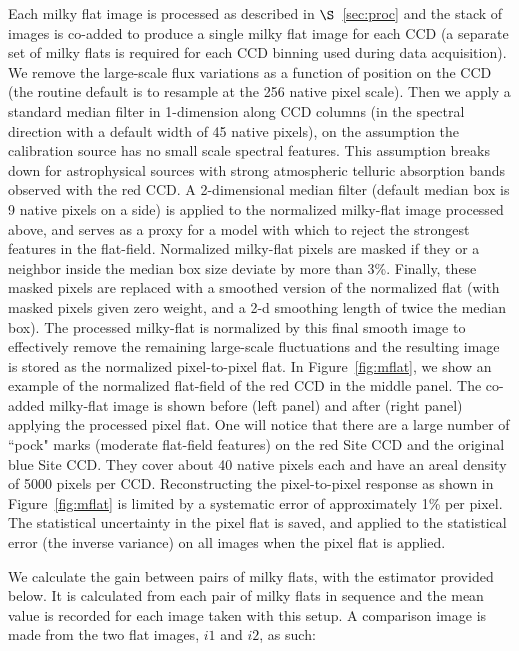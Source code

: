 \documentclass[]{emulateapj}
\begin{document}
Each milky flat image is processed as described in $\S$~\ref{sec:proc}
and the stack of images is co-added to produce a single milky flat image 
for each CCD 
(a separate set of milky flats is required for each 
CCD binning used during data acquisition).
We remove the large-scale flux variations as a function of position on the
CCD (the routine default is to resample at the 256 native pixel scale).
Then we apply a standard median filter in 1-dimension along CCD columns
(in the spectral direction with a default width of 45 native pixels),
on the assumption the calibration source has no small scale spectral features.
This assumption breaks down for astrophysical sources with 
strong atmospheric telluric absorption bands observed with the red CCD.
A 2-dimensional median filter (default median box is 9 native pixels on a side)
is applied to the normalized milky-flat image processed above,
and serves as a proxy for a model with which to reject the strongest features 
in the flat-field.  Normalized milky-flat pixels are masked if they or a 
neighbor inside the median box size deviate by more than 3\%.  Finally, these masked
pixels are replaced with a smoothed version of the normalized flat (with masked pixels given zero weight, and a 2-d smoothing length of twice the median box).  
The processed milky-flat is normalized by this final smooth image to 
effectively remove the remaining large-scale fluctuations and the resulting 
image is stored as the normalized pixel-to-pixel flat.  
In Figure~\ref{fig:mflat}, we 
show an example of the normalized flat-field of the red CCD in the middle panel.
The co-added milky-flat image is shown before (left panel) and after 
(right panel) applying the processed pixel flat.  
One will notice that there are a large number of ``pock" marks 
(moderate flat-field features) on the red Site CCD and 
the original blue Site CCD.  They cover about 40 native pixels each and have an 
areal density of 5000 pixels per CCD.    
Reconstructing the pixel-to-pixel response as shown in Figure~\ref{fig:mflat} 
is limited by a systematic error of approximately 1\% per pixel.
The statistical uncertainty in the pixel flat is saved, and applied to
the statistical error (the inverse variance) on all images when 
the pixel flat is applied.

We calculate the gain between pairs of milky flats, with the estimator
provided below.  It is calculated from each pair of milky flats in 
sequence and the mean value is recorded for each image taken with this setup.
A comparison image is made from the two flat images, $i1$ and $i2$, as such:
\end{document}
